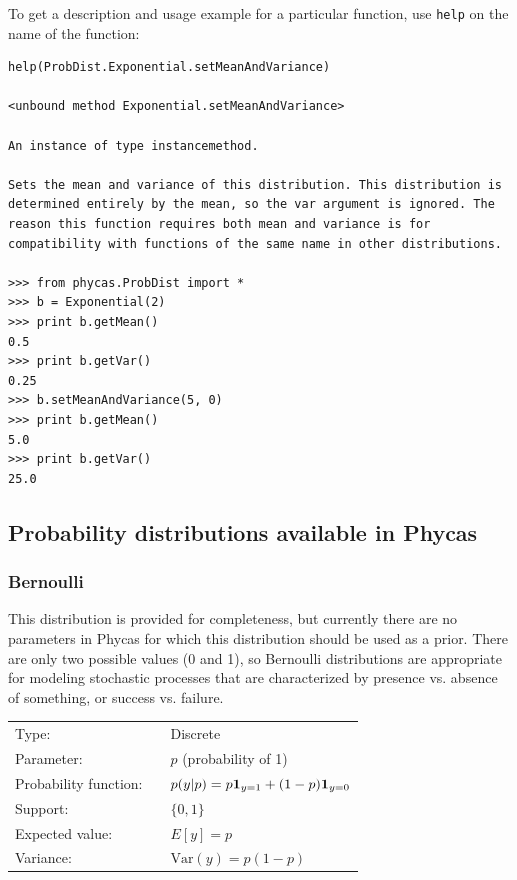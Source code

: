 \documentclass[10pt]{article}
\newcommand{\code}[1]{{\tt #1}}				%
\newcommand{\one}[1]{\mbox{${\bf 1}_{#1}$}}
\newcommand{\Var}{\mbox{Var}}
\begin{document}
%
To get a description and usage example for a particular function, use \code{help} on the name of the function:
%
\begin{verbatim}
help(ProbDist.Exponential.setMeanAndVariance)

<unbound method Exponential.setMeanAndVariance>

An instance of type instancemethod.

Sets the mean and variance of this distribution. This distribution is
determined entirely by the mean, so the var argument is ignored. The
reason this function requires both mean and variance is for
compatibility with functions of the same name in other distributions.

>>> from phycas.ProbDist import *
>>> b = Exponential(2)
>>> print b.getMean()
0.5
>>> print b.getVar()
0.25
>>> b.setMeanAndVariance(5, 0)
>>> print b.getMean()
5.0
>>> print b.getVar()
25.0
\end{verbatim}

\subsection{Probability distributions available in Phycas}\label{availabledistributions}

\subsubsection{Bernoulli}\label{bernoullidist}

\renewcommand{\arraystretch}{1.5}

This distribution is provided for completeness, but currently there are no parameters in Phycas for which this distribution should be used as a prior. There are only two possible values (0 and 1), so Bernoulli distributions are appropriate for modeling stochastic processes that are characterized by presence vs. absence of something, or success vs. failure.

\begin{tabular}{lcl}
Type:                 & & Discrete \\
Parameter:            & & $p$ (probability of 1) \\
Probability function: & & $p(y|p) = p \one{y=1} + (1-p) \one{y=0}$ \\
Support:              & & $\{0,1\}$  \\
Expected value:       & & $E[y] = p$ \\
Variance:             & & $\Var(y) = p(1-p)$ 
\end{tabular}
\end{document}
